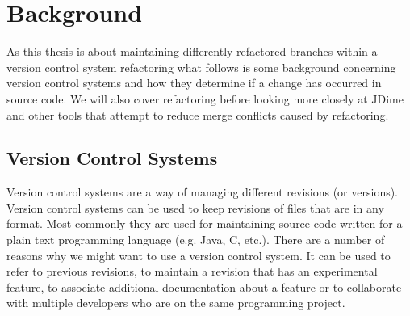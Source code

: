 \chapter{Background}

As this thesis is about maintaining differently refactored branches within a version control system refactoring what follows is some background concerning version control systems and how they determine if a change has occurred in source code.  We will also cover refactoring before looking more closely at JDime and other tools that attempt to reduce merge conflicts caused by refactoring.  

\section{Version Control Systems}
Version control systems are a way of managing different revisions (or versions). Version control systems can be used to keep revisions of files that are in any format. Most commonly they are used for maintaining source code written for a plain text programming language (e.g. Java, C, etc.). There are a number of reasons why we might want to use a version control system. It can be used to refer to previous revisions, to maintain a revision that has an experimental feature, to associate additional documentation about a feature or to collaborate with multiple developers who are on the same programming project.

